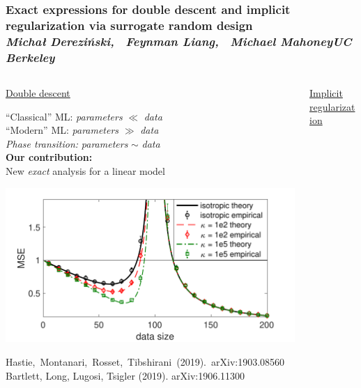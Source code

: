 \documentclass[8pt]{beamer}
\edef\polishl{\l}
\begin{document}
\begin{frame}
  \frametitle{
\centering\textrm{Exact expressions for double descent and
    implicit regularization via surrogate random design}\\[1mm]
\normalsize{\it Micha{\polishl } Derezi\'{n}ski, \ Feynman Liang,
  \ Michael Mahoney\qquad UC Berkeley}\\[-5mm]
}
\begin{columns}
  \begin{column}{0.53\textwidth}
    \begin{center}
      {
        \large\underline{Double descent}}
    \end{center}
    \vspace{2mm}
    
    ``Classical'' ML: \hfill\textit{parameters} $\ll$ \textit{data}\quad~\\
    ``Modern'' ML: \hfill \textit{parameters} $\gg$ \textit{data}\quad~\\
\textit{Phase transition:} \hfill\textit{parameters} $\sim$ \textit{data}\quad~\\[7mm]
\textbf{Our contribution:}\\
New \textit{exact} analysis for a linear model
    
\includegraphics[width=\textwidth]{figs/descent-intro-nice}
\vspace{2mm}

{\footnotesize
\mbox{Hastie, Montanari, Rosset, Tibshirani (2019).~arXiv:1903.08560}\\
   Bartlett, Long, Lugosi, Tsigler (2019). arXiv:1906.11300\\
}
  

\end{column}
\begin{column}{0.53\textwidth}
    \begin{center}
      {
        \large\underline{Implicit regularization}}
  \end{center}
  \vspace{2mm}
  

\end{column}
\end{columns}
\end{frame}
\end{document}
